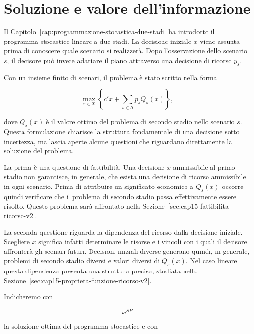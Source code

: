 
\chapter{Soluzione e valore dell'informazione}

\label{cap:soluzione-valore-informazione-v2}

\medskip

Il Capitolo~\ref{cap:programmazione-stocastica-due-stadi} ha introdotto il
programma stocastico lineare a due stadi. La decisione iniziale $x$ viene
assunta prima di conoscere quale scenario si realizzer\`a. Dopo
l'osservazione dello scenario $s$, il decisore pu\`o invece adattare il piano
attraverso una decisione di ricorso $y_s$.

Con un insieme finito di scenari, il problema \`e stato scritto nella forma

\[
\max_{x\in\mathcal X}
\left\{
c'x+
\sum_{s\in\mathcal S}p_sQ_s(x)
\right\},
\]

dove $Q_s(x)$ \`e il valore ottimo del problema di secondo stadio nello
scenario $s$.
Questa formulazione chiarisce la struttura fondamentale di una decisione
sotto incertezza, ma lascia aperte alcune questioni che riguardano direttamente
la soluzione del problema.

La prima \`e una questione di fattibilit\`a. Una decisione $x$ ammissibile al
primo stadio non garantisce, in generale, che esista una decisione di ricorso
ammissibile in ogni scenario. Prima di attribuire un significato economico a
$Q_s(x)$ occorre quindi verificare che il problema di secondo stadio possa
effettivamente essere risolto. Questo problema sar\`a affrontato nella
Sezione~\ref{sec:cap15-fattibilita-ricorso-v2}.

La seconda questione riguarda la dipendenza del ricorso dalla decisione
iniziale. Scegliere $x$ significa infatti determinare le risorse e i vincoli
con i quali il decisore affronter\`a gli scenari futuri. Decisioni iniziali
diverse generano quindi, in generale, problemi di secondo stadio diversi e
valori diversi di $Q_s(x)$. Nel caso lineare questa dipendenza presenta una
struttura precisa, studiata nella
Sezione~\ref{sec:cap15-proprieta-funzione-ricorso-v2}.

Indicheremo con

\[
x^{SP}
\]

la soluzione ottima del programma stocastico e con

